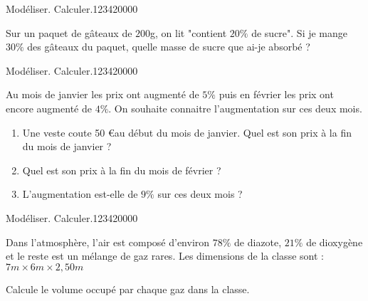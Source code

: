 \begin{pageParcourst}



\begin{ExoCt}{Modéliser. Calculer.}{1234}{2}{0}{0}{0}{0}
 

Sur un paquet de gâteaux de $200$g, on lit "contient $20\%$ de sucre".  Si je mange $30\%$ des gâteaux du paquet, quelle masse de sucre que ai-je absorbé ?
 
 
\end{ExoCt}


\begin{ExoCt}{Modéliser. Calculer.}{1234}{2}{0}{0}{0}{0}

Au mois de janvier les prix ont augmenté de $5\%$ puis en février les prix ont encore augmenté de $4\%$. On souhaite connaitre l'augmentation sur ces deux mois.
 
\begin{enumerate}[leftmargin=*]
\item Une veste coute 50 \euro au début du mois de janvier. Quel est son prix à la fin du mois de janvier ?  
\item Quel est son prix à la fin du mois de février ?  
\item L'augmentation est-elle de $9\%$ sur ces deux mois ?  
\end{enumerate}

 
\end{ExoCt}


\begin{ExoCt}{Modéliser. Calculer.}{1234}{2}{0}{0}{0}{0}

Dans l'atmosphère, l'air est composé d'environ $78\%$ de diazote, $21\%$ de dioxygène et le reste est un mélange de gaz rares. Les dimensions de la classe sont : $7m \times 6m  \times 2,50m$

Calcule le volume occupé par chaque gaz dans la classe.


 
\end{ExoCt}


 
\end{pageParcourst}


\begin{pageBrouillon} 
 

\end{pageBrouillon}


